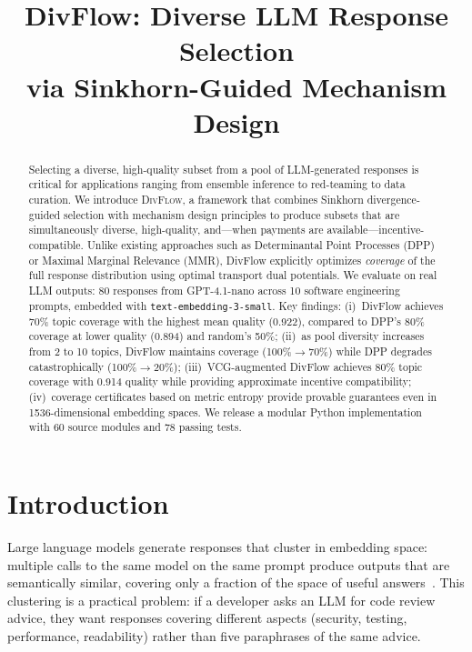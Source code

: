 \documentclass[10pt]{article}
\title{\textbf{DivFlow: Diverse LLM Response Selection\\via Sinkhorn-Guided Mechanism Design}}
\date{}
\begin{document}
\maketitle

\begin{abstract}
Selecting a diverse, high-quality subset from a pool of LLM-generated responses is critical for applications ranging from ensemble inference to red-teaming to data curation.
We introduce \textsc{DivFlow}, a framework that combines Sinkhorn divergence-guided selection with mechanism design principles to produce subsets that are simultaneously diverse, high-quality, and---when payments are available---incentive-compatible.
Unlike existing approaches such as Determinantal Point Processes (DPP) or Maximal Marginal Relevance (MMR), DivFlow explicitly optimizes \emph{coverage} of the full response distribution using optimal transport dual potentials.
We evaluate on real LLM outputs: 80 responses from GPT-4.1-nano across 10 software engineering prompts, embedded with \texttt{text-embedding-3-small}.
Key findings: (i)~DivFlow achieves 70\% topic coverage with the highest mean quality (0.922), compared to DPP's 80\% coverage at lower quality (0.894) and random's 50\%;
(ii)~as pool diversity increases from 2 to 10 topics, DivFlow maintains coverage (100\%$\to$70\%) while DPP degrades catastrophically (100\%$\to$20\%);
(iii)~VCG-augmented DivFlow achieves 80\% topic coverage with 0.914 quality while providing approximate incentive compatibility;
(iv)~coverage certificates based on metric entropy provide provable guarantees even in 1536-dimensional embedding spaces.
We release a modular Python implementation with 60 source modules and 78 passing tests.
\end{abstract}

\section{Introduction}
\label{sec:intro}

Large language models generate responses that cluster in embedding space: multiple calls to the same model on the same prompt produce outputs that are semantically similar, covering only a fraction of the space of useful answers~\citep{wang2023selfconsistency, li2023diverse}.
This clustering is a practical problem: if a developer asks an LLM for code review advice, they want responses covering different aspects (security, testing, performance, readability) rather than five paraphrases of the same advice.
\end{document}
